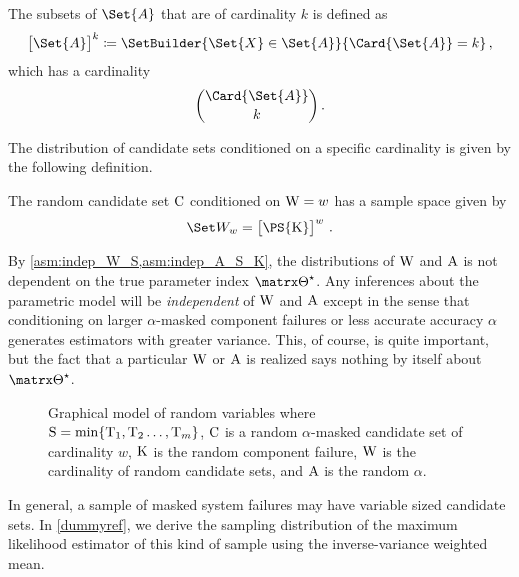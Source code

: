 \documentclass[../main.tex]{subfiles}
\begin{document}
\begin{definition}
	The subsets of $\Set{A}$ that are of cardinality $k$ is defined as
	\begin{equation}
	\left[\Set{A}\right]^k \coloneqq \SetBuilder{\Set{X} \in \Set{A}}{\Card{\Set{A}} = k}\,,
	\end{equation}
	which has a cardinality
	\begin{equation}
	\binom{\Card{\Set{A}}}{k}\,.
	\end{equation}
\end{definition}

The distribution of candidate sets conditioned on a specific cardinality is given by the following definition.
\begin{definition}
	The random candidate set $\mathrm{C}$ conditioned on $\mathrm{W} = w$ has a sample space given by
	\begin{equation}
	\candsw{w} = \left[\PS{\RV{K}}\right]^w\,.
	\end{equation}
\end{definition}
By \cref{asm:indep_W_S,asm:indep_A_S_K}, the distributions of $\mathrm{W}$ and $\mathrm{A}$ is not dependent on the true parameter index $\tparam\sysparam$.
Any inferences about the parametric model will be \emph{independent} of $\mathrm{W}$ and $\mathrm{A}$ except in the sense that conditioning on larger $\alpha$-masked component failures or less accurate accuracy $\alpha$ generates estimators with greater variance.
This, of course, is quite important, but the fact that a particular $\mathrm{W}$ or $\mathrm{A}$ is realized says nothing by itself about $\tparam\sysparam$.


\begin{figure}
	\label{fig:gen_model_alpha}
	\caption{Graphical model of random variables where $\mathrm{S} = \min\{\mathrm{T}_1,\mathrm{T}_2\ldots,\mathrm{T}_m\}$, $\mathrm{C}$ is a random $\alpha$-masked candidate set of cardinality $w$, $\mathrm{K}$ is the random component failure, $\mathrm{W}$ is the cardinality of random candidate sets, and $\mathrm{A}$ is the random $\alpha$.}
	\begin{center}
		
	\end{center}
\end{figure}
In general, a sample of masked system failures may have variable sized candidate sets. In \cref{dummyref}, we derive the sampling distribution of the maximum likelihood estimator of this kind of sample using the inverse-variance weighted mean.
\end{document}
